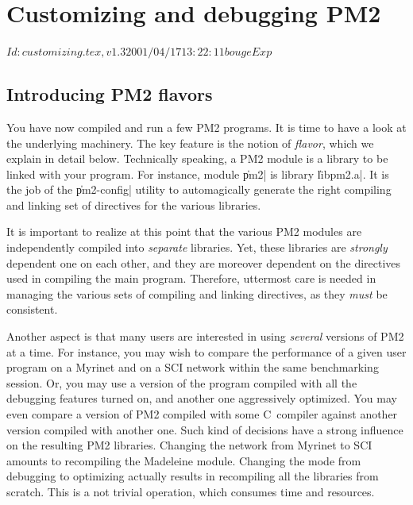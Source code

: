 \chapter{Customizing and debugging PM2}

\stamp $Id: customizing.tex,v 1.3 2001/04/17 13:22:11 bouge Exp $

\section{Introducing PM2 flavors}

You have now compiled and run a few PM2 programs. It is time to have a
look at the underlying machinery. The key feature is the notion of
\emph{flavor}, which we explain in detail below. Technically speaking,
a PM2 module is a library to be linked with your program. For
instance, module \|pm2| is library \|libpm2.a|. It is the job of the
\|pm2-config| utility to automagically generate the right compiling
and linking set of directives for the various libraries.

It is important to realize at this point that the various PM2 modules
are independently compiled into \emph{separate} libraries. Yet, these
libraries are \emph{strongly} dependent one on each other, and they
are moreover dependent on the directives used in compiling the main
program. Therefore, uttermost care is needed in managing the various
sets of compiling and linking directives, as they \emph{must} be
consistent. 

Another aspect is that many users are interested in using
\emph{several} versions of PM2 at a time. For instance, you may wish
to compare the performance of a given user program on a Myrinet and on
a SCI network within the same benchmarking session. Or, you may use a
version of the program compiled with all the debugging features turned
on, and another one aggressively optimized. You may even compare a
version of PM2 compiled with some C~compiler against another version
compiled with another one.  Such kind of decisions have a strong
influence on the resulting PM2 libraries. Changing the network from
Myrinet to SCI amounts to recompiling the Madeleine module.  Changing
the mode from debugging to optimizing actually results in recompiling
all the libraries from scratch. This is a not trivial operation, which
consumes time and resources.

